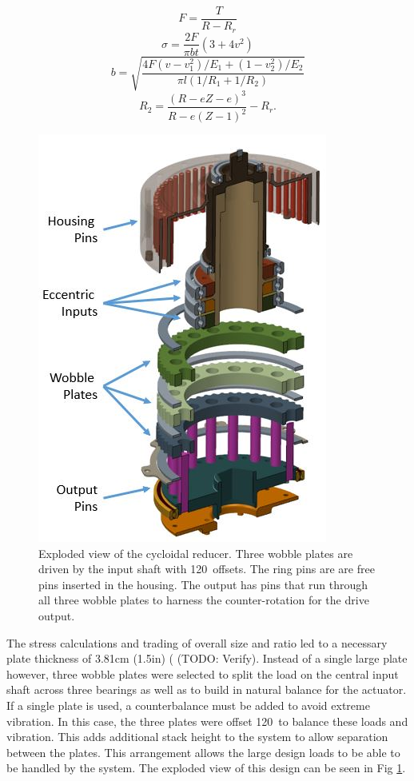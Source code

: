 \begin{equation} \label{eq:5}
F = \frac{T}{R - R_r}
\end{equation}
\begin{equation} \label{eq:6}
\sigma = \frac{2F}{\pi b t} (3 + 4v^2)
\end{equation}
\begin{equation} \label{eq:7}
b = \sqrt{\frac{4F (v-v_1^2) /E_1 + (1 - v_2^2)/E_2}{\pi l (1/R_1 + 1/R_2)}}
\end{equation}
\begin{equation} \label{eq:8}
R_2 = \frac{(R-eZ - e)^3}{R-e(Z-1)^2} - R_r.
\end{equation}

   \begin{figure}[!b]
      \centering
      \includegraphics[width=0.75\linewidth]{exploded_labeled}
      \caption{Exploded view of the cycloidal reducer. Three wobble plates are driven by the input shaft with 120\textdegree\ offsets. The ring pins are are free pins inserted in the housing. The output has pins that run through all three wobble plates to harness the counter-rotation for the drive output.}
      \label{cycloid_exploded}
   \end{figure}
   
The stress calculations and trading of overall size and ratio led to a necessary plate thickness of 3.81cm (1.5in) ( (TODO: Verify). Instead of a single large plate however, three wobble plates were selected to split the load on the central input shaft across three bearings as well as to build in natural balance for the actuator. If a single plate is used, a counterbalance must be added to avoid extreme vibration. In this case, the three plates were offset 120\textdegree\ to balance these loads and vibration. This adds additional stack height to the system to allow separation between the plates. This arrangement allows the large design loads to be able to be handled by the system. The exploded view of this design can be seen in Fig \ref{cycloid_exploded}. 

